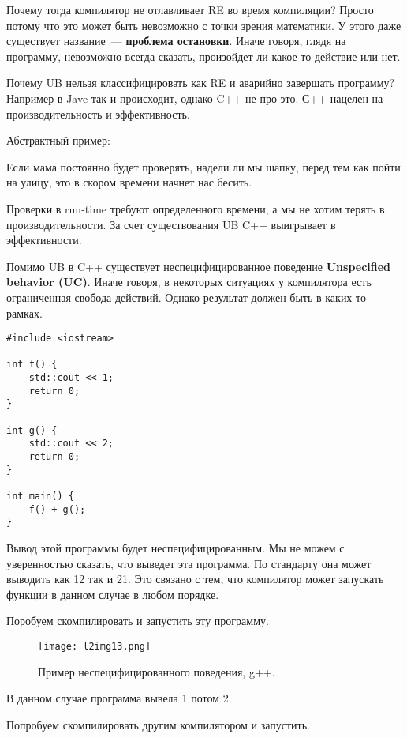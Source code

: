 Почему тогда компилятор не отлавливает RE во время компиляции? Просто потому что это может быть невозможно с точки зрения математики.
У этого даже существует название~--- \textbf{проблема остановки}. Иначе говоря, глядя на программу, невозможно всегда сказать, произойдет ли какое-то действие или нет.

Почему UB нельзя классифицировать как RE и аварийно завершать программу? Например в Jave так и происходит, однако C++ не про это.
С++ нацелен на производительность и эффективность.

Абстрактный пример: 
\begin{center}
Если мама постоянно будет проверять, надели ли мы шапку, перед тем как пойти на улицу, это в скором времени начнет нас бесить.
\end{center}

Проверки в run-time требуют определенного времени, а мы не хотим терять в производительности.
За счет существования UB C++ выигрывает в эффективности.

Помимо UB в C++ существует неспецифицированное поведение
\textbf{Unspecified behavior (UC)}.
Иначе говоря, в некоторых ситуациях у компилятора есть ограниченная свобода действий.
Однако результат должен быть в каких-то рамках.

\begin{verbatim}
#include <iostream>

int f() {
    std::cout << 1;
    return 0;
}

int g() {
    std::cout << 2;
    return 0;
}

int main() {
    f() + g();
}
\end{verbatim}

Вывод этой программы будет неспецифицированным.
Мы не можем с уверенностью сказать, что выведет эта программа.
По стандарту она может выводить как 12 так и 21. Это связано с тем,
что компилятор может запускать функции в данном случае в любом порядке.

Поробуем скомпилировать и запустить эту программу.

\begin{figure}[h]
    \centering
    \texttt{[image: l2img13.png]}
    \caption{Пример неспецифицированного поведения, g++.}
    \label{l2img13}
\end{figure}

В данном случае программа вывела 1 потом 2.

Попробуем скомпилировать другим компилятором и запустить.

